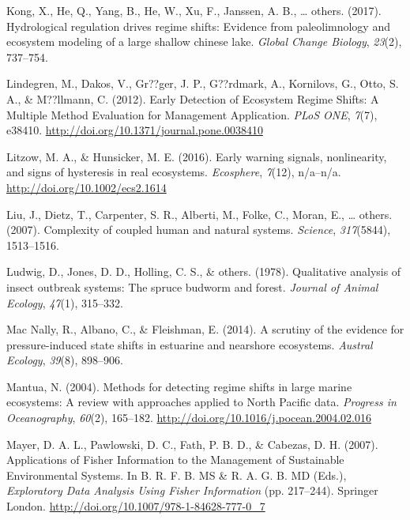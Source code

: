 \documentclass[12pt,twoside,openany]{reedthesis}
\begin{document}
\hypertarget{ref-kong2017hydrological}{}
Kong, X., He, Q., Yang, B., He, W., Xu, F., Janssen, A. B., \ldots{}
others. (2017). Hydrological regulation drives regime shifts: Evidence
from paleolimnology and ecosystem modeling of a large shallow chinese
lake. \emph{Global Change Biology}, \emph{23}(2), 737--754.

\hypertarget{ref-lindegren_early_2012}{}
Lindegren, M., Dakos, V., Gr??ger, J. P., G??rdmark, A., Kornilovs, G.,
Otto, S. A., \& M??llmann, C. (2012). Early Detection of Ecosystem
Regime Shifts: A Multiple Method Evaluation for Management Application.
\emph{PLoS ONE}, \emph{7}(7), e38410.
\url{http://doi.org/10.1371/journal.pone.0038410}

\hypertarget{ref-litzow_early_2016}{}
Litzow, M. A., \& Hunsicker, M. E. (2016). Early warning signals,
nonlinearity, and signs of hysteresis in real ecosystems.
\emph{Ecosphere}, \emph{7}(12), n/a--n/a.
\url{http://doi.org/10.1002/ecs2.1614}

\hypertarget{ref-liu_complexity_2007}{}
Liu, J., Dietz, T., Carpenter, S. R., Alberti, M., Folke, C., Moran, E.,
\ldots{} others. (2007). Complexity of coupled human and natural
systems. \emph{Science}, \emph{317}(5844), 1513--1516.

\hypertarget{ref-ludwig1978qualitative}{}
Ludwig, D., Jones, D. D., Holling, C. S., \& others. (1978). Qualitative
analysis of insect outbreak systems: The spruce budworm and forest.
\emph{Journal of Animal Ecology}, \emph{47}(1), 315--332.

\hypertarget{ref-mac2014scrutiny}{}
Mac Nally, R., Albano, C., \& Fleishman, E. (2014). A scrutiny of the
evidence for pressure-induced state shifts in estuarine and nearshore
ecosystems. \emph{Austral Ecology}, \emph{39}(8), 898--906.

\hypertarget{ref-mantua_methods_2004}{}
Mantua, N. (2004). Methods for detecting regime shifts in large marine
ecosystems: A review with approaches applied to North Pacific data.
\emph{Progress in Oceanography}, \emph{60}(2), 165--182.
\url{http://doi.org/10.1016/j.pocean.2004.02.016}

\hypertarget{ref-mayer_applications_2007}{}
Mayer, D. A. L., Pawlowski, D. C., Fath, P. B. D., \& Cabezas, D. H.
(2007). Applications of Fisher Information to the Management of
Sustainable Environmental Systems. In B. R. F. B. MS \& R. A. G. B. MD
(Eds.), \emph{Exploratory Data Analysis Using Fisher Information} (pp.
217--244). Springer London.
\url{http://doi.org/10.1007/978-1-84628-777-0_7}
\end{document}
